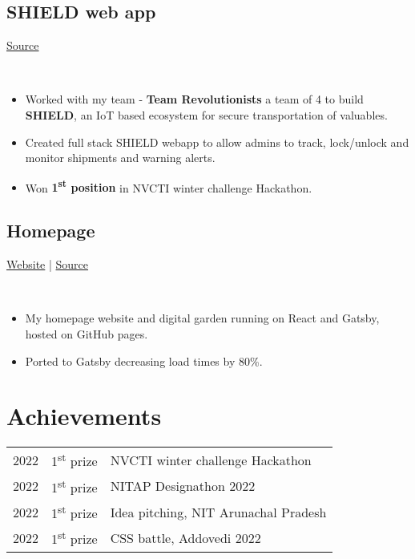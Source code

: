 \documentclass[]{article}
\newcommand{\subheading}[2]{
  {\subsection{#1}
  \hfill{#2}}\\
  \vspace{2pt}
}
\newenvironment{tightemize}{
\vspace{-\topsep}\begin{itemize}\itemsep1pt \parskip0pt \parsep0pt}
{\end{itemize}\vspace{-\topsep}}
\begin{document}
\begin{multicols}{2}
\begin{flushleft}
    \subheading{SHIELD web app}{\href{https://github.com/tripathics}{Source}}
    \begin{tightemize}
      \item Worked with my team - \textbf{Team Revolutionists} a team of 4 to build \textbf{SHIELD}, an IoT based ecosystem for secure transportation of valuables.
      \item Created full stack SHIELD webapp to allow admins to track, lock/unlock and monitor shipments and warning alerts.
      \item Won \textbf{1\textsuperscript{st} position} in NVCTI winter challenge Hackathon.
    \end{tightemize}

    \subheading{Homepage}{
      \href{https://tripathics.github.io}{Website} | 
      \href{https://github.com/tripathics/tripathics.githbu.io/tree/src}{Source} 
    }
    \begin{tightemize}
      \item My homepage website and digital garden running on React and Gatsby, hosted on GitHub pages.
      \item Ported to Gatsby decreasing load times by 80\%.
    \end{tightemize}

    \section{Achievements}
    \begin{tabular}{rll}
      2022 & 1\textsuperscript{st} prize & NVCTI winter challenge Hackathon\\
      2022 & 1\textsuperscript{st} prize & NITAP Designathon 2022\\
      2022 & 1\textsuperscript{st} prize & Idea pitching, NIT Arunachal Pradesh\\
      2022 & 1\textsuperscript{st} prize & CSS battle, Addovedi 2022\\
    \end{tabular}
  \end{flushleft}
\end{multicols}
\end{document}
